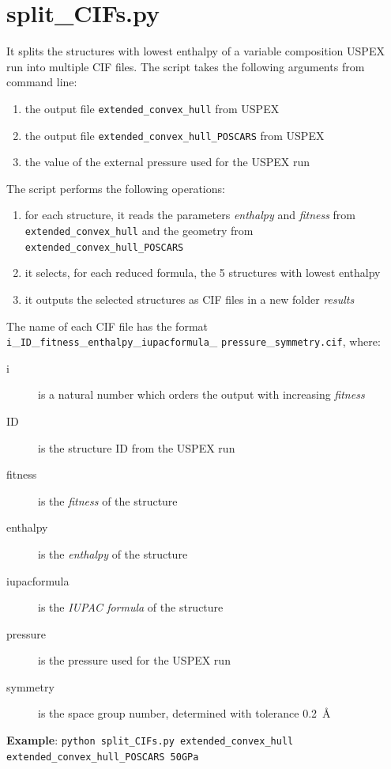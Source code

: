 \documentclass{article}
\begin{document}
\section{split\_CIFs.py}
It splits the structures with lowest enthalpy of a variable composition USPEX run into multiple CIF files. The script takes the following arguments from command line:
\begin{enumerate}
	\item the output file \texttt{extended\_convex\_hull} from USPEX
	\item the output file \texttt{extended\_convex\_hull\_POSCARS} from USPEX
	\item the value of the external pressure used for the USPEX run
\end{enumerate}
The script performs the following operations:
\begin{enumerate}
	\item for each structure, it reads the parameters \emph{enthalpy} and \emph{fitness} from \texttt{extended\_convex\_hull} and the geometry from \texttt{extended\_convex\_hull\_POSCARS}
	\item it selects, for each reduced formula, the 5 structures with lowest enthalpy
	\item it outputs the selected structures as CIF files in a new folder \textit{results}
\end{enumerate}
The name of each CIF file has the format \texttt{i}\_\texttt{ID}\_\texttt{fitness}\_\texttt{enthalpy}\_\texttt{iupacformula}\_ \texttt{pressure}\_\texttt{symmetry.cif}, where:
\begin{description}
	\item[i] is a natural number which orders the output with increasing \emph{fitness}
	\item[ID] is the structure ID from the USPEX run
	\item[fitness] is the \emph{fitness} of the structure
	\item[enthalpy] is the \emph{enthalpy} of the structure
	\item[iupacformula] is the \emph{IUPAC formula} of the structure
	\item[pressure] is the pressure used for the USPEX run
	\item[symmetry] is the space group number, determined with tolerance 0.2~\AA
\end{description}
\textbf{Example}: \texttt{python split\_CIFs.py extended\_convex\_hull \\ extended\_convex\_hull\_POSCARS 50GPa}
\end{document}
